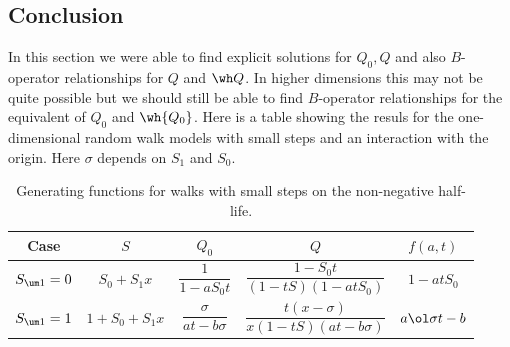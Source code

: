 \subsection{Conclusion}
In this section we were able to find explicit solutions for $Q_0, Q$ and also $B$-operator relationships for $Q$ and $\wh Q$. In higher dimensions this may not be quite possible but we should still be able to find $B$-operator relationships for the equivalent of $Q_0$ and $\wh{Q_0}$.  Here is a table showing the resuls for the one-dimensional random walk models with small steps and an interaction with the origin. Here $\sigma$ depends on $S_1$ and $S_0$.
 \begin{table}[H]
    \caption{Generating functions for walks with small steps on the non-negative half-life.}
    \label{tbl:table1d}
    \centering
    \begin{tabular}{ccccc}
    \toprule
    Case & $S$ & $Q_0$ & $Q$ & $f(a,t)$\\
    \midrule
    $S_{\um 1} = 0$ & $S_0 + S_1 x$ & $\dfrac{1}{1- a S_0t}$ & $\dfrac{1-S_0 t}{(1-tS)(1-atS_0)}$ & $1-atS_0 $ \\
    $S_{\um 1} = 1$ & $1+S_0+S_1 x$ & $\dfrac{\sigma}{at - b\sigma}$ & $\dfrac{t(x- \sigma)}{x(1-tS)(at-b\sigma)}$ & $a\ol \sigma t-b$\\
    \bottomrule
    \end{tabular}
\end{table}

\endinput

